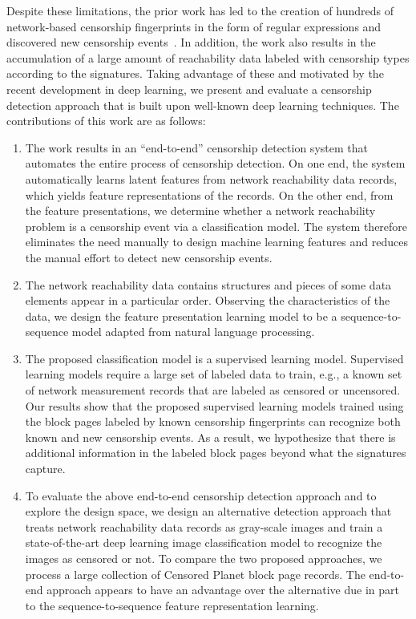 Despite these limitations, the prior work has led to the creation of hundreds
of network-based censorship fingerprints in the form of regular expressions and
discovered new censorship events~\cite{niaki2020iclab,
sundara_raman_censored_2020}. In addition, the work also results in the
accumulation of a large amount of reachability data labeled with censorship
types according to the signatures. Taking advantage of these and motivated
by the recent development in deep learning, we present and evaluate a 
censorship detection approach that is built upon well-known deep learning
techniques. The contributions of this work are as follows: 
\begin{enumerate}
	\item The work results in an ``end-to-end'' censorship detection system
		that automates the entire process of censorship detection.  On one
		end, the system automatically learns latent features from network
		reachability data records, which yields feature
		representations of the records. On the other end, from the feature
		presentations, we determine whether a network reachability problem is a
		censorship event via a classification model. The system therefore
		eliminates the need manually to design machine learning features and
		reduces the manual effort to detect new censorship events.  

	\item The network reachability data contains structures and
		pieces of some data elements appear in a particular order. Observing the
		characteristics of the data, we design the feature presentation learning 
		model to be a sequence-to-sequence model adapted from natural language processing. 

	\item The proposed classification model is a supervised learning model. Supervised
		learning models require a large set of labeled data to train, e.g., a
		known set of network measurement records that are labeled as censored or uncensored.  Our
		results show that the proposed supervised learning models trained using
		the block pages labeled by known censorship fingerprints 
		can recognize both known and new censorship
		events.  As a result, we hypothesize that there is additional information
		in the labeled block pages beyond what the signatures capture. 

	\item To evaluate the above end-to-end censorship detection approach and to 
		explore the design space, we design an alternative detection approach 
		that treats network reachability data records as gray-scale images
		and train a state-of-the-art deep learning image classification 
		model to recognize the images as
		censored or not. To compare the two proposed approaches, 
		we process a large collection of Censored Planet block page records.
		The end-to-end approach appears to have an advantage over the
		alternative due in part to the sequence-to-sequence feature representation
		learning.


\end{enumerate}
